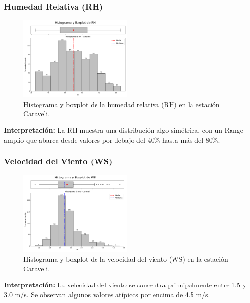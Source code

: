 \subsubsection*{Humedad Relativa (RH)}
\begin{figure}[H]
\centering
\includegraphics[width=0.5\textwidth]{resultados/por_estacion_meteorologica/Caraveli/RH_histograma.png}
\caption{Histograma y boxplot de la humedad relativa (RH) en la estación Caraveli.}
\label{fig:caraveli_RH}
\end{figure}
\textbf{Interpretación:} La RH muestra una distribución algo simétrica, con un Range amplio que abarca desde valores por debajo del 40\% hasta más del 80\%.

\subsubsection*{Velocidad del Viento (WS)}
\begin{figure}[H]
\centering
\includegraphics[width=0.5\textwidth]{resultados/por_estacion_meteorologica/Caraveli/WS_histograma.png}
\caption{Histograma y boxplot de la velocidad del viento (WS) en la estación Caraveli.}
\label{fig:caraveli_WS}
\end{figure}
\textbf{Interpretación:} La velocidad del viento se concentra principalmente entre 1.5 y 3.0 m/s. Se observan algunos valores atípicos por encima de 4.5 m/s.

